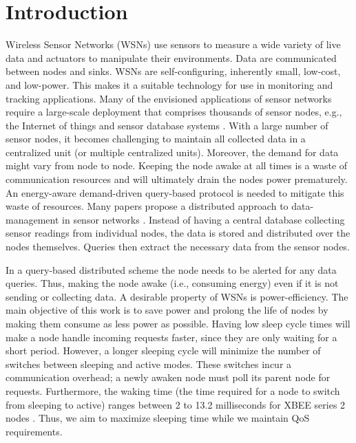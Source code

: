 \section{Introduction}\label{sec:Intro}

Wireless Sensor Networks (WSNs) use sensors to measure a wide variety of live data and actuators to manipulate their environments. Data are communicated between nodes and sinks. WSNs are self-configuring, inherently small, low-cost, and low-power. This makes it a suitable technology for use in monitoring and tracking applications. Many of the envisioned applications of sensor networks require a large-scale deployment that comprises thousands of sensor nodes, e.g., the Internet of things \cite{22} and sensor database systems \cite{2}. With a large number of sensor nodes, it becomes challenging to maintain all collected data in a centralized unit (or multiple centralized units). Moreover, the demand for data might vary from node to node. Keeping the node awake at all times is a waste of communication resources and will ultimately drain the nodes power prematurely. An energy-aware demand-driven query-based protocol is needed to mitigate this waste of resources. Many papers propose a distributed approach to data-management in sensor networks \cite{2,4.11,23}. Instead of having a central database collecting sensor readings from individual nodes, the data is stored and distributed over the nodes themselves. Queries then extract the necessary data from the sensor nodes. 

In a query-based distributed scheme the node needs to be alerted for any data queries. Thus, making the node awake (i.e., consuming energy) even if it is not sending or collecting data. A desirable property of WSNs is power-efficiency. The main objective of this work is to save power and prolong the life of nodes by making them consume as less power as possible. Having low sleep cycle times will make a node handle incoming requests faster, since they are only waiting for a short period. However, a longer sleeping cycle will minimize the number of switches between sleeping and active modes. These switches incur a communication overhead; a newly awaken node must poll its parent node for requests. Furthermore, the waking time (the time required for a node to switch from sleeping to active) ranges between 2 to 13.2 milliseconds for XBEE series 2 nodes \cite{19}. Thus, we aim to maximize sleeping time while we maintain QoS requirements.

